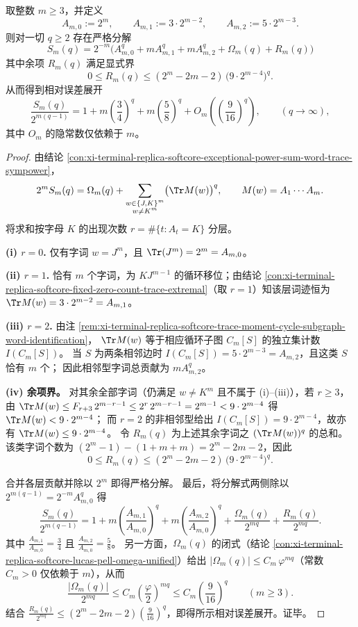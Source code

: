 \begin{conclusion}[例外幂和的三项主导展开与显式余项界]\label{con:xi-terminal-replica-softcore-exceptional-moments-exponential-hierarchy}
取整数 \(m\ge 3\)，并定义
\[
A_{m,0}:=2^{m},\qquad
A_{m,1}:=3\cdot 2^{m-2},\qquad
A_{m,2}:=5\cdot 2^{m-3}.
\]
则对一切 \(q\ge 2\) 存在严格分解
\[
\boxed{\;
S_m(q)=2^{-m}\Big(A_{m,0}^{q}+mA_{m,1}^{q}+mA_{m,2}^{q}+\Omega_m(q)+R_m(q)\Big)\;}
\]
其中余项 \(R_m(q)\) 满足显式界
\[
0\le R_m(q)\le (2^{m}-2m-2)\,\bigl(9\cdot 2^{m-4}\bigr)^{q}.
\]
从而得到相对误差展开
\[
\frac{S_m(q)}{2^{m(q-1)}}=
1+m\left(\frac34\right)^{q}
+m\left(\frac58\right)^{q}
+O_m\!\left(\left(\frac{9}{16}\right)^{q}\right),
\qquad (q\to\infty),
\]
其中 \(O_m\) 的隐常数仅依赖于 \(m\)。
\end{conclusion}
\begin{proof}
由结论 \ref{con:xi-terminal-replica-softcore-exceptional-power-sum-word-trace-sympower}，
\[
2^mS_m(q)=\Omega_m(q)+\sum_{\substack{w\in\{J,K\}^m\\ w\neq K^m}}\bigl(\Tr M(w)\bigr)^q,
\qquad M(w)=A_1\cdots A_m.
\]
将求和按字母 \(K\) 的出现次数 \(r=\#\{t:A_t=K\}\) 分层。
\par
\textbf{(i) \(r=0\).}
仅有字词 \(w=J^m\)，且 \(\Tr(J^m)=2^m=A_{m,0}\)。
\par
\textbf{(ii) \(r=1\).}
恰有 \(m\) 个字词，为 \(KJ^{m-1}\) 的循环移位；由结论 \ref{con:xi-terminal-replica-softcore-fixed-zero-count-trace-extremal}（取 \(r=1\)）知该层词迹恒为
\(\Tr M(w)=3\cdot 2^{m-2}=A_{m,1}\)。
\par
\textbf{(iii) \(r=2\).}
由注 \ref{rem:xi-terminal-replica-softcore-trace-moment-cycle-subgraph-word-identification}，
\(\Tr M(w)\) 等于相应循环子图 \(C_m[S]\) 的独立集计数 \(I(C_m[S])\)。
当 \(S\) 为两条相邻边时 \(I(C_m[S])=5\cdot 2^{m-3}=A_{m,2}\)，且这类 \(S\) 恰有 \(m\) 个；
因此相邻型字词总贡献为 \(mA_{m,2}^{q}\)。
\par
\textbf{(iv) 余项界。}
对其余全部字词（仍满足 \(w\neq K^m\) 且不属于 (i)--(iii)），若 \(r\ge 3\)，由
\(
\Tr M(w)\le F_{r+3}\,2^{m-r-1}\le 2^{r}\,2^{m-r-1}=2^{m-1}<9\cdot 2^{m-4}
\)
得 \(\Tr M(w)<9\cdot 2^{m-4}\)；
而 \(r=2\) 的非相邻型给出 \(I(C_m[S])=9\cdot 2^{m-4}\)，故亦有 \(\Tr M(w)\le 9\cdot 2^{m-4}\)。
令 \(R_m(q)\) 为上述其余字词之 \((\Tr M(w))^q\) 的总和。
该类字词个数为 \((2^m-1)-(1+m+m)=2^m-2m-2\)，因此
\[
0\le R_m(q)\le (2^{m}-2m-2)\,\bigl(9\cdot 2^{m-4}\bigr)^{q}.
\]
\par
合并各层贡献并除以 \(2^m\) 即得严格分解。
最后，将分解式两侧除以 \(2^{m(q-1)}=2^{-m}A_{m,0}^q\) 得
\[
\frac{S_m(q)}{2^{m(q-1)}}=
1+m\left(\frac{A_{m,1}}{A_{m,0}}\right)^q
+m\left(\frac{A_{m,2}}{A_{m,0}}\right)^q
+\frac{\Omega_m(q)}{2^{mq}}
+\frac{R_m(q)}{2^{mq}}.
\]
其中 \(\frac{A_{m,1}}{A_{m,0}}=\frac34\) 且 \(\frac{A_{m,2}}{A_{m,0}}=\frac58\)。
另一方面，\(\Omega_m(q)\) 的闭式（结论 \ref{con:xi-terminal-replica-softcore-lucas-pell-omega-unified}）给出
\(|\Omega_m(q)|\le C_m\,\varphi^{mq}\)（常数 \(C_m>0\) 仅依赖于 \(m\)），从而
\[
\frac{|\Omega_m(q)|}{2^{mq}}\le C_m\left(\frac{\varphi}{2}\right)^{mq}
\le C_m\left(\frac{9}{16}\right)^q
\qquad(m\ge 3).
\]
结合 \(\frac{R_m(q)}{2^{mq}}\le (2^m-2m-2)\left(\frac{9}{16}\right)^q\)，即得所示相对误差展开。证毕。
\end{proof}

